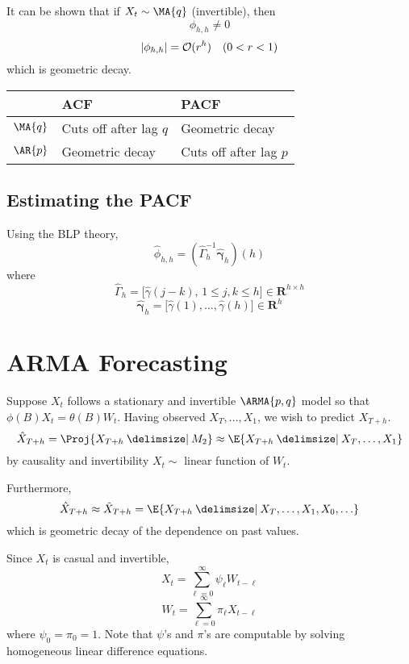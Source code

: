 \begin{Remark}{}{}
    It can be shown that if $ X_t \sim \MA{q} $ (invertible), then
    \[ \phi_{h,h}\ne 0 \]
    \[ \lvert\phi_{h,h}\rvert=\mathcal{O}(r^h)\quad(0<r<1) \]
    which is geometric decay.
    \begin{center}
        \begin{tabularx}{0.5\linewidth}{@{}YYY@{}}
                       & ACF                      & PACF                     \\
            \midrule
            $ \MA{q} $ & Cuts off after lag $ q $ & Geometric decay          \\
            $ \AR{p} $ & Geometric decay          & Cuts off after lag $ p $
        \end{tabularx}
    \end{center}
\end{Remark}
\subsection*{Estimating the PACF}
Using the BLP theory,
\[ \hat{\phi}_{h,h}=(\hat{\Gamma}_h^{-1}\hat{\symbf{\gamma}}_h)(h) \]
where
\[ \hat{\Gamma}_h=\bigl[\hat{\gamma}(j-k),\, 1\le j,k\le h\bigr]\in\mathbf{R}^{h\times h} \]
\[ \hat{\symbf{\gamma}}_h=\bigl[\hat{\gamma}(1),\ldots,\hat{\gamma}(h)\bigr]\in\mathbf{R}^h \]

\section{ARMA Forecasting}
Suppose $ X_t $ follows a stationary and invertible $ \ARMA{p,q} $
model so that $ \phi(B)X_t=\theta(B)W_t $. Having observed
$ X_T,\ldots,X_1 $, we wish to predict $ X_{T+h} $.
\[ \hat{X}_{T+h}=\Proj{X_{T+h}\onto M_2}\approx \E{X_{T+h}\given X_{T},\ldots,X_1} \]
by causality and invertibility $ X_t \sim $ linear function of $ W_t $.

Furthermore,
\[ \hat{X}_{T+h}\approx \tilde{X}_{T+h}=\E{X_{T+h}\given X_{T},\ldots,X_1,X_0,\ldots} \]
which is geometric decay of the dependence on past values.

Since $ X_t $ is casual and invertible,
\[ X_t=\sum_{\ell=0}^{\infty} \psi_\ell W_{t-\ell} \]
\[ W_t=\sum_{\ell=0}^{\infty} \pi_\ell X_{t-\ell} \]
where $ \psi_0=\pi_0=1 $. Note that
$ \psi $'s and $ \pi $'s are computable by solving homogeneous
linear difference equations.

